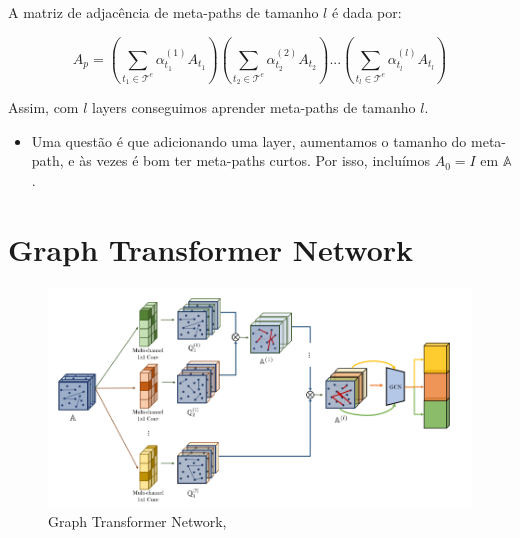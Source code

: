 \documentclass[12pt,notheorems,hyperref={pdfauthor=whatever}]{beamer}
\begin{document}
\begin{frame}
    A matriz de adjacência de meta-paths de tamanho $l$ é dada por:

    $$A_p = \left( \sum_{t_1 \in \mathcal{T}^e} \alpha_{t_1}^{(1)}A_{t_1}\right)\left( \sum_{t_2 \in \mathcal{T}^e} \alpha_{t_2}^{(2)}A_{t_2}\right)...\left( \sum_{t_l \in \mathcal{T}^e} \alpha_{t_l}^{(l)}A_{t_l}\right)$$

    Assim, com $l$ layers conseguimos aprender meta-paths de tamanho $l$.

\vspace{15pt}

    \begin{itemize}
        \item Uma questão é que adicionando uma layer, aumentamos o tamanho do meta-path, e às vezes é bom ter meta-paths curtos. Por isso, incluímos $A_0 = I$ em $\mathbb{A}$.
    \end{itemize}
\end{frame}


\section{Graph Transformer Network}
\begin{frame}

\begin{figure}
    \centering
    \includegraphics[width=460pt]{img/gt-complete.png}
    \caption{Graph Transformer Network, \cite{DBLP:journals/corr/abs-1911-06455}}
    \label{fig:gtn}
\end{figure}

\end{frame}
\end{document}
